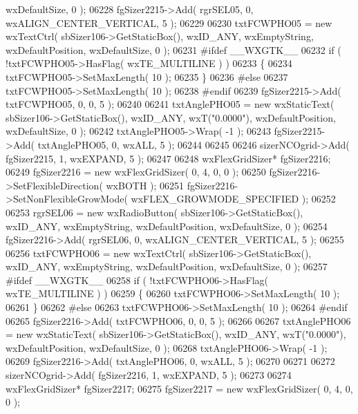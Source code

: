 \begin{DoxyCode}
      wxDefaultSize, 0 );
06228     fgSizer2215->Add( rgrSEL05, 0, wxALIGN\_CENTER\_VERTICAL, 5 );
06229     
06230     txtFCWPHO05 = \textcolor{keyword}{new} wxTextCtrl( sbSizer106->GetStaticBox(), wxID\_ANY, wxEmptyString, wxDefaultPosition, 
      wxDefaultSize, 0 );
06231 \textcolor{preprocessor}{    #ifdef \_\_WXGTK\_\_}
06232     \textcolor{keywordflow}{if} ( !txtFCWPHO05->HasFlag( wxTE\_MULTILINE ) )
06233     \{
06234     txtFCWPHO05->SetMaxLength( 10 );
06235     \}
06236 \textcolor{preprocessor}{    #else}
06237     txtFCWPHO05->SetMaxLength( 10 );
06238 \textcolor{preprocessor}{    #endif}
06239     fgSizer2215->Add( txtFCWPHO05, 0, 0, 5 );
06240     
06241     txtAnglePHO05 = \textcolor{keyword}{new} wxStaticText( sbSizer106->GetStaticBox(), wxID\_ANY, wxT(\textcolor{stringliteral}{"0.0000"}), 
      wxDefaultPosition, wxDefaultSize, 0 );
06242     txtAnglePHO05->Wrap( -1 );
06243     fgSizer2215->Add( txtAnglePHO05, 0, wxALL, 5 );
06244     
06245     
06246     sizerNCOgrid->Add( fgSizer2215, 1, wxEXPAND, 5 );
06247     
06248     wxFlexGridSizer* fgSizer2216;
06249     fgSizer2216 = \textcolor{keyword}{new} wxFlexGridSizer( 0, 4, 0, 0 );
06250     fgSizer2216->SetFlexibleDirection( wxBOTH );
06251     fgSizer2216->SetNonFlexibleGrowMode( wxFLEX\_GROWMODE\_SPECIFIED );
06252     
06253     rgrSEL06 = \textcolor{keyword}{new} wxRadioButton( sbSizer106->GetStaticBox(), wxID\_ANY, wxEmptyString, wxDefaultPosition, 
      wxDefaultSize, 0 );
06254     fgSizer2216->Add( rgrSEL06, 0, wxALIGN\_CENTER\_VERTICAL, 5 );
06255     
06256     txtFCWPHO06 = \textcolor{keyword}{new} wxTextCtrl( sbSizer106->GetStaticBox(), wxID\_ANY, wxEmptyString, wxDefaultPosition, 
      wxDefaultSize, 0 );
06257 \textcolor{preprocessor}{    #ifdef \_\_WXGTK\_\_}
06258     \textcolor{keywordflow}{if} ( !txtFCWPHO06->HasFlag( wxTE\_MULTILINE ) )
06259     \{
06260     txtFCWPHO06->SetMaxLength( 10 );
06261     \}
06262 \textcolor{preprocessor}{    #else}
06263     txtFCWPHO06->SetMaxLength( 10 );
06264 \textcolor{preprocessor}{    #endif}
06265     fgSizer2216->Add( txtFCWPHO06, 0, 0, 5 );
06266     
06267     txtAnglePHO06 = \textcolor{keyword}{new} wxStaticText( sbSizer106->GetStaticBox(), wxID\_ANY, wxT(\textcolor{stringliteral}{"0.0000"}), 
      wxDefaultPosition, wxDefaultSize, 0 );
06268     txtAnglePHO06->Wrap( -1 );
06269     fgSizer2216->Add( txtAnglePHO06, 0, wxALL, 5 );
06270     
06271     
06272     sizerNCOgrid->Add( fgSizer2216, 1, wxEXPAND, 5 );
06273     
06274     wxFlexGridSizer* fgSizer2217;
06275     fgSizer2217 = \textcolor{keyword}{new} wxFlexGridSizer( 0, 4, 0, 0 );

\end{DoxyCode}
